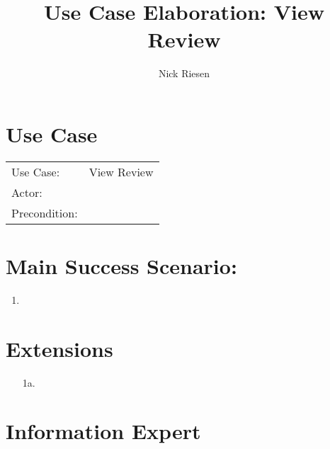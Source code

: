 \documentclass{article}
\title{Use Case Elaboration: View Review}
\author{ Nick Riesen }
\begin{document}
\maketitle


\section*{Use Case}
\begin{tabular}{l l}
Use Case:     & View Review\\
Actor:        & \\
Precondition: & \\
\end{tabular}


\section*{Main Success Scenario:}

\begin{enumerate}
    \item 

\end{enumerate}

\section*{Extensions}

\begin{itemize}
    \item [1a.]
                            
\end{itemize}


\section*{Information Expert}
\end{document}
